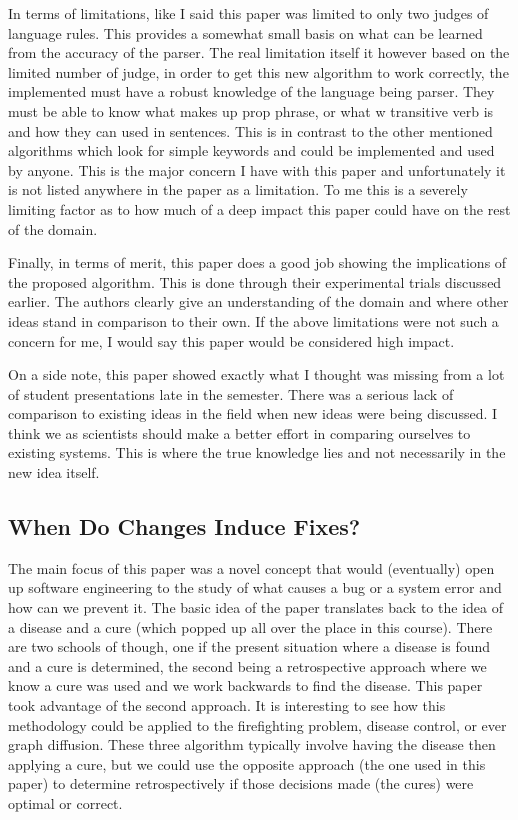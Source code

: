 \documentclass[conference]{IEEEtran}
\begin{document}
In terms of limitations, like I said this paper was limited to only two judges of language rules. This provides a somewhat small basis
on what can be learned from the accuracy of the parser. The real limitation itself it however based on the limited number of judge, in order
to get this new algorithm to work correctly, the implemented must have a robust knowledge of the language being parser. They must be able
to know what makes up prop phrase, or what w transitive verb is and how they can used in sentences. This is in contrast to the other mentioned
algorithms which look for simple keywords and could be implemented and used by anyone. This is the major concern I have with this paper and
unfortunately it is not listed anywhere in the paper as a limitation. To me this is a severely limiting factor as to how much of a deep
impact this paper could have on the rest of the domain.

Finally, in terms of merit, this paper does a good job showing the implications of the proposed algorithm. This is done through their
experimental trials discussed earlier. The authors clearly give an understanding of the domain and where other ideas stand in comparison
to their own. If the above limitations were not such a concern for me, I would say this paper would be considered high impact.

On a side note, this paper showed exactly what I thought was missing from a lot of student presentations late in the semester. There
was a serious lack of comparison to existing ideas in the field when new ideas were being discussed. I think we as scientists should make
a better effort in comparing ourselves to existing systems. This is where the true knowledge lies and not necessarily in the new idea
itself.

\subsection{When Do Changes Induce Fixes?}

The main focus of this paper was a novel concept that would (eventually) open up software engineering to the study of what causes a bug
or a system error and how can we prevent it. The basic idea of the paper translates back to the idea of a disease and a cure (which popped
up all over the place in this course). There are two schools of though, one if the present situation where a disease is found and a cure is
determined, the second being a retrospective approach where we know a cure was used and we work backwards to find the disease. This paper
took advantage of the second approach. It is interesting to see how this methodology could be applied to the firefighting problem, disease
control, or ever graph diffusion. These three algorithm typically involve having the disease then applying a cure, but we could use the
opposite approach (the one used in this paper) to determine retrospectively if those decisions made (the cures) were optimal or correct.
\end{document}
